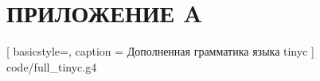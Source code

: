 \section*{ПРИЛОЖЕНИЕ A}\label{sec:app-A}


[
    basicstyle=\tiny,
    caption = Дополненная грамматика языка tinyc \label{lst:grammar}
]
{code/full_tinyc.g4}
